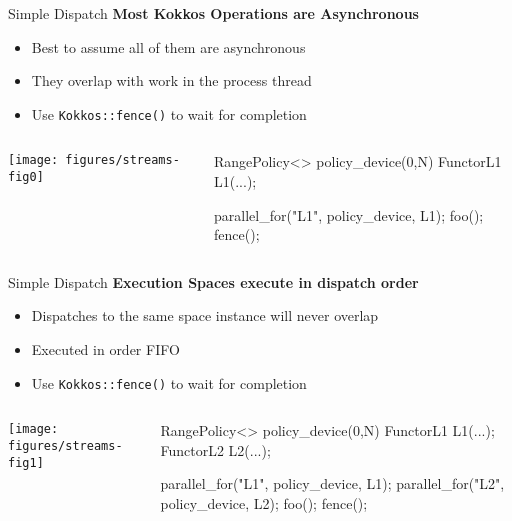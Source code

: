 \begin{frame}[fragile]{Simple Dispatch}
  \textbf{Most Kokkos Operations are Asynchronous}
  \begin{itemize}
    \item{Best to assume all of them are asynchronous}
    \item{They overlap with work in the process thread}
    \item{Use \texttt{Kokkos::fence()} to wait for completion}
  \end{itemize}

  \begin{columns}[]
    \begin{column}{.67\textwidth}

       \texttt{[image: figures/streams-fig0]} 
 
    \end{column}

    \begin{column}{.33\textwidth}
	    \begin{code}[linebackgroundcolor={},keywords={L1,L2,policy_device}]
RangePolicy<> 
  policy_device(0,N)
FunctorL1 L1(...);

parallel_for("L1", 
  policy_device, L1);
foo();
fence();
      \end{code}
    \end{column}
  \end{columns}
\end{frame}

\begin{frame}[fragile]{Simple Dispatch}
  \textbf{Execution Spaces execute in dispatch order}
  \begin{itemize}
    \item{Dispatches to the same space instance will never overlap}
    \item{Executed in order FIFO}
    \item{Use \texttt{Kokkos::fence()} to wait for completion}
  \end{itemize}

  \begin{columns}[]
    \begin{column}{.67\textwidth}

       \texttt{[image: figures/streams-fig1]} 
 
    \end{column}

    \begin{column}{.33\textwidth}
	    \begin{code}[linebackgroundcolor={},keywords={L1,L2,policy_device}]
RangePolicy<> 
  policy_device(0,N)
FunctorL1 L1(...);
FunctorL2 L2(...);

parallel_for("L1", 
  policy_device, L1);
parallel_for("L2", 
  policy_device, L2);
foo();
fence();
      \end{code}
    \end{column}
  \end{columns}
\end{frame}

